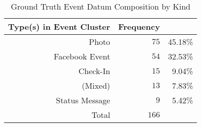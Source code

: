 \begin{table}[htp]
	\begin{center}
	\caption{Ground Truth Event Datum Composition by Kind}
	\label{tab:table_gt_comp_by_type}
		\begin{tabular}{r r r}
		\toprule
			{Type(s) in Event Cluster} & {Frequency} & {}\\
			\midrule
			Photo & $75$ & 45.18\%\\
			Facebook Event & $54$ & 32.53\%\\
			Check-In & $15$ & 9.04\%\\
			(Mixed) & $13$ & 7.83\%\\
			Status Message & $9$ & 5.42\%\\
			\midrule Total & $166$ & \\
		\bottomrule
		\end{tabular}
	\end{center}
\end{table}